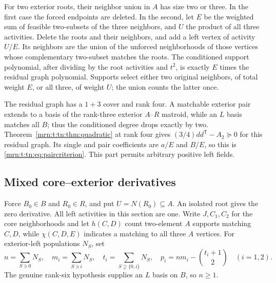 \documentclass[11pt,a4paper]{article}
\theoremstyle{remark}\newtheorem{remark}[theorem]{Remark}
\newcommand{\PSD}{\succeq}                 %
\begin{document}
For two exterior roots, their neighbor union in $A$ has size two or three.
In the first case the forced endpoints are deleted. In the second, let
$E$ be the weighted sum of feasible two-subsets of the three neighbors,
and $U$ the product of all three activities. Delete the roots and their
neighbors, and add a left vertex of activity $U/E$. Its neighbors are the
union of the unforced neighborhoods of those vertices whose complementary
two-subset matches the roots. The conditioned support polynomial, after
dividing by the root activities and $t^2$, is exactly $E$ times the residual
graph polynomial. Supports select either two original neighbors, of total
weight $E$, or all three, of weight $U$; the union counts the latter once.

The residual graph has a $1+3$ cover and rank four. A matchable exterior
pair extends to a basis of the rank-three exterior $A$--$R$ matroid, while
an $L$ basis matches all $B$; thus the conditioned degree drops exactly by
two. Theorem~\ref{mrn:t:tn:thm:quadratic} at rank four gives
$(3/4)dd^{\mathsf T}-A_2\PSD0$ for this residual graph.
Its single and pair coefficients are $a/E$ and $B/E$, so this is
\eqref{mrn:t:tn:eq:paircriterion}. This part permits arbitrary positive left fields.

\subsection{Mixed core--exterior derivatives}\label{mrn:t:tn:br:section}
Force $B_0\in B$ and $R_0\in R$, and put $U=N(R_0)\subseteq A$.
An isolated root gives the zero derivative. All left activities in this
section are one. Write $J,C_1,C_2$ for the core neighborhoods and let
$h(C,D)$ count two-element $A$ supports matching $C,D$, while
$\chi(C,D,E)$ indicates a matching to all three $A$ vertices.
For exterior-left populations $N_S$, set
\[
 n=\sum_{S\ni0}N_S,\quad m_i=\sum_{S\ni i}N_S,\quad
 t_i=\sum_{S\supseteq\{0,i\}}N_S,\quad
 p_i=nm_i-\binom{t_i+1}{2}\quad(i=1,2).
\]
The genuine rank-six hypothesis supplies an $L$ basis on $B$, so $n\ge1$.
\end{document}
